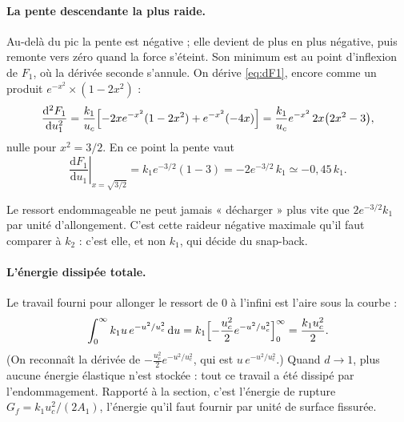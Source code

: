 \documentclass[11pt,a4paper]{article}
\newcommand{\dd}{\mathrm{d}}
\newcommand{\uc}{u_c}
\begin{document}
\paragraph{La pente descendante la plus raide.} Au-delà du pic la pente est négative ; elle
devient de plus en plus négative, puis remonte vers zéro quand la force s'éteint. Son minimum
est au point d'inflexion de $F_1$, où la dérivée seconde s'annule. On dérive \eqref{eq:dF1},
encore comme un produit $e^{-x^2}\times(1-2x^2)$ :
\begin{equation}
  \frac{\dd^2F_1}{\dd u_1^2} = \frac{k_1}{\uc}\Bigl[-2xe^{-x^2}(1-2x^2) + e^{-x^2}(-4x)\Bigr]
  = \frac{k_1}{\uc}e^{-x^2}\,2x\bigl(2x^2-3\bigr),
\end{equation}
nulle pour $x^2 = 3/2$. En ce point la pente vaut
\begin{equation}
  \left.\frac{\dd F_1}{\dd u_1}\right|_{x=\sqrt{3/2}} = k_1e^{-3/2}(1-3) = -2e^{-3/2}\,k_1 \simeq -0{,}45\,k_1 .
  \label{eq:pentemax}
\end{equation}
\begin{idee}
Le ressort endommageable ne peut jamais « décharger » plus vite que $2e^{-3/2}k_1$ par unité
d'allongement. C'est cette raideur négative maximale qu'il faut comparer à $k_2$ : c'est
elle, et non $k_1$, qui décide du snap-back.
\end{idee}

\paragraph{L'énergie dissipée totale.} Le travail fourni pour allonger le ressort de 0 à
l'infini est l'aire sous la courbe :
\begin{equation}
  \int_0^\infty k_1u\,e^{-u^2/\uc^2}\,\dd u = k_1\Bigl[-\frac{\uc^2}{2}e^{-u^2/\uc^2}\Bigr]_0^\infty
  = \frac{k_1\uc^2}{2}.
\end{equation}
(On reconnaît la dérivée de $-\tfrac{\uc^2}{2}e^{-u^2/\uc^2}$, qui est $u\,e^{-u^2/\uc^2}$.)
Quand $d\to1$, plus aucune énergie élastique n'est stockée : tout ce travail a été dissipé par
l'endommagement. Rapporté à la section, c'est l'énergie de rupture
$G_f = k_1\uc^2/(2A_1)$, l'énergie qu'il faut fournir par unité de surface fissurée.
\end{document}
